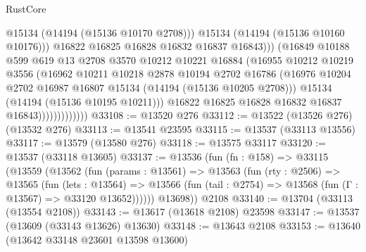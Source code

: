 \begin{lexlean}{RustCore}
\begin{coremodule}
                                    @15134
                                    (@14194 (@15136 @10170 @2708)))
                                  @15134
                                  (@14194 (@15136 @10160 @10176)))
                                @16822
                                @16825
                                @16828
                                @16832
                                @16837
                                @16843)))
                          (@16849
                            @10188
                            @599
                            @619
                            @13
                            @2708
                            @3570
                            @10212
                            @10221
                            @16884
                            (@16955
                              @10212
                              @10219
                              @3556
                              (@16962
                                @10211
                                @10218
                                @2878
                                @10194
                                @2702
                                @16786
                                (@16976
                                  @10204
                                  @2702
                                  @16987
                                  @16807
                                  @15134
                                  (@14194 (@15136 @10205 @2708)))
                                @15134
                                (@14194 (@15136 @10195 @10211)))
                              @16822
                              @16825
                              @16828
                              @16832
                              @16837
                              @16843)))))))))))))
@33108 := @13520 @276
@33112 := @13522 (@13526 @276) (@13532 @276)
@33113 := @13541 @23595
@33115 := @13537 (@33113 @13556)
@33117 := @13579 (@13580 @276)
@33118 := @13575 @33117
@33120 := @13537 (@33118 @13605)
@33137 := @13536
    (fun (fn : @158) =>
    @33115
      (@13559
        (@13562
          (fun (params : @13561) =>
          @13563
            (fun (rty : @2506) =>
            @13565
              (fun (lets : @13564) =>
              @13566 (fun (tail : @2754) => @13568 (fun (Γ : @13567) => @33120 @13652))))))
        @13698))
    @2108
@33140 := @13704 (@33113 (@13554 @2108))
@33143 := @13617 (@13618 @2108) @23598
@33147 := @13537 (@13609 (@33143 @13626) @13630)
@33148 := @13643 @2108
@33153 := @13640 (@13642 @33148 @23601 @13598 @13600)

\end{coremodule}
\end{lexlean}
